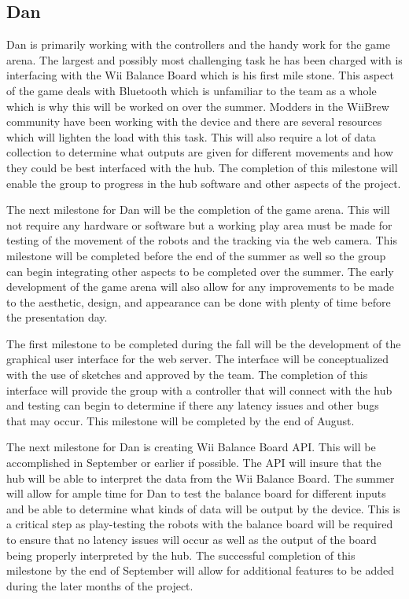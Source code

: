 \documentclass[11pt]{ieeeconf}
\begin{document}
\subsection{Dan}

Dan is primarily working with the controllers and the handy work for the game arena. The largest and possibly most challenging task he has been charged with is interfacing with the Wii Balance Board which is his first mile stone. This aspect of the game deals with Bluetooth which is unfamiliar to the team as a whole which is why this will be worked on over the summer. Modders in the WiiBrew \cite{homebrew} community have been working with the device and there are several resources which will lighten the load with this task. This will also require a lot of data collection to determine what outputs are given for different movements and how they could be best interfaced with the hub. The completion of this milestone will enable the group to progress in the hub software and other aspects of the project.

The next milestone for Dan will be the completion of the game arena. This will not require any hardware or software but a working play area must be made for testing of the movement of the robots and the tracking via the web camera. This milestone will be completed before the end of the summer as well so the group can begin integrating other aspects to be completed over the summer. The early development of the game arena will also allow for any improvements to be made to the aesthetic, design, and appearance can be done with plenty of time before the presentation day.

The first milestone to be completed during the fall will be the development of the graphical user interface for the web server. The interface will be conceptualized with the use of sketches and approved by the team. The completion of this interface will provide the group with a controller that will connect with the hub and testing can begin to determine if there any latency issues and other bugs that may occur. This milestone will be completed by the end of August.  

The next milestone for Dan is creating Wii Balance Board API. This will be accomplished in September or earlier if possible. The API will insure that the hub will be able to interpret the data from the Wii Balance Board. The summer will allow for ample time for Dan to test the balance board for different inputs and be able to determine what kinds of data will be output by the device. This is a critical step as play-testing the robots with the balance board will be required to ensure that no latency issues will occur as well as the output of the board being properly interpreted by the hub. The successful completion of this milestone by the end of September will allow for additional features to be added during the later months of the project.  
\end{document}
